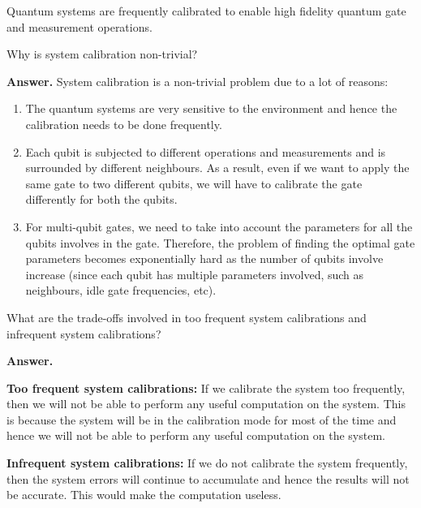 Quantum systems are frequently calibrated to enable high fidelity quantum gate and measurement operations.

\tcbline{}

\begin{question}
    Why is system calibration non-trivial?
\end{question}
\textbf{Answer.} System calibration is a non-trivial problem due to a lot of reasons:
\begin{enumerate}
    \item The quantum systems are very sensitive to the environment and hence the calibration needs to be done frequently.
    \item Each qubit is subjected to different operations and measurements and is surrounded by different neighbours. As a result, even if we want to apply the same gate to two different qubits, we will have to calibrate the gate differently for both the qubits.
    \item For multi-qubit gates, we need to take into account the parameters for all the qubits involves in the gate. Therefore, the problem of finding the optimal gate parameters becomes exponentially hard as the number of qubits involve increase (since each qubit has multiple parameters involved, such as neighbours, idle gate frequencies, etc).
\end{enumerate}

\tcbline{}

\begin{question}
    What are the trade-offs involved in too frequent system calibrations and infrequent system calibrations?
\end{question}
\textbf{Answer.}

\textbf{Too frequent system calibrations:} If we calibrate the system too frequently, then we will not be able to perform any useful computation on the system. This is because the system will be in the calibration mode for most of the time and hence we will not be able to perform any useful computation on the system.

\textbf{Infrequent system calibrations:} If we do not calibrate the system frequently, then the system errors will continue to accumulate and hence the results will not be accurate. This would make the computation useless.

\tcbline{}

